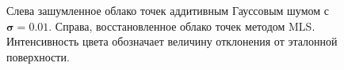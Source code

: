 \begin{figure}[h]
  \centering
  \caption{Слева зашумленное облако точек аддитивным Гауссовым шумом с $\boldsymbol{\sigma = 0.01}$. Справа, восстановленное облако точек методом MLS. Интенсивность цвета обозначает величину отклонения от эталонной поверхности.}
\end{figure}

